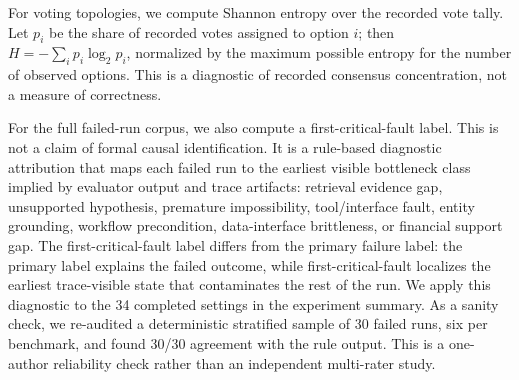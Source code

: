 \documentclass{article}
\theoremstyle{plain}
\theoremstyle{definition}
\theoremstyle{remark}
\begin{document}
\begin{table}[t]
\centering
\small
{}
\caption{Tool-result state rules used for StableToolBench Markov transitions. If multiple cues appear, \emph{error} takes precedence over \emph{sparse}.}
\label{tab:tool_state_rules}
\end{table}

For voting topologies, we compute Shannon entropy over the recorded vote tally. Let \(p_i\) be the share of recorded votes assigned to option \(i\); then \(H=-\sum_i p_i\log_2 p_i\), normalized by the maximum possible entropy for the number of observed options. This is a diagnostic of recorded consensus concentration, not a measure of correctness.

For the full failed-run corpus, we also compute a first-critical-fault label. This is not a claim of formal causal identification. It is a rule-based diagnostic attribution that maps each failed run to the earliest visible bottleneck class implied by evaluator output and trace artifacts: retrieval evidence gap, unsupported hypothesis, premature impossibility, tool/interface fault, entity grounding, workflow precondition, data-interface brittleness, or financial support gap. The first-critical-fault label differs from the primary failure label: the primary label explains the failed outcome, while first-critical-fault localizes the earliest trace-visible state that contaminates the rest of the run. We apply this diagnostic to the 34 completed settings in the experiment summary. As a sanity check, we re-audited a deterministic stratified sample of 30 failed runs, six per benchmark, and found 30/30 agreement with the rule output. This is a one-author reliability check rather than an independent multi-rater study.
\end{document}
